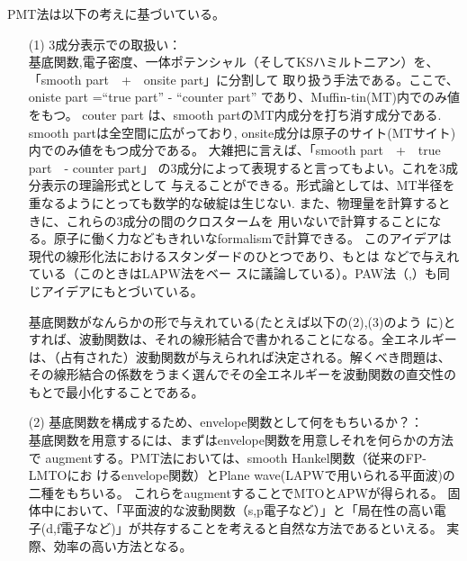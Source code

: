\documentclass[a4paper,10pt,aip,onecolumn,amsmath,amssymb,floatfix,rmp]{revtex4-1}
\begin{document}
PMT法は以下の考えに基づいている。
\begin{itemize}
\item[(1)]
3成分表示での取扱い：\\
基底関数,電子密度、一体ポテンシャル（そしてKSハミルトニアン）を、
「smooth part　+　onsite part」に分割して
取り扱う手法である。ここで、oniste part =``true part'' - ``counter part''
であり、Muffin-tin(MT)内でのみ値をもつ。
couter part は、smooth partのMT内成分を打ち消す成分である.
smooth partは全空間に広がっており,
onsite成分は原子のサイト(MTサイト)内でのみ値をもつ成分である。
大雑把に言えば、「smooth part　+　true part　- counter part」
の3成分によって表現すると言ってもよい。これを3成分表示の理論形式として
与えることができる。形式論としては、MT半径を重なるようにとっても数学的な破綻は生じない.
また、物理量を計算するときに、これらの3成分の間のクロスタームを
用いないで計算することになる。原子に働く力などもきれいなformalismで計算できる。
このアイデアは現代の線形化法におけるスタンダードのひとつであり、もとは
\cite{soler89}などで与えれている（このときはLAPW法をベー
スに議論している）。PAW法（\cite{PAW},\cite{kresse99}）も同じアイデアにもとづいている。

基底関数がなんらかの形で与えれている(たとえば以下の(2),(3)のよう
に)とすれば、波動関数は、それの線形結合で書かれることになる。全エネルギー
は、（占有された）波動関数が与えられれば決定される。解くべき問題は、
その線形結合の係数をうまく選んでその全エネルギーを波動関数の直交性のもとで最小化することである。



\item[(2)]
基底関数を構成するため、envelope関数として何をもちいるか？：\\
基底関数を用意するには、まずはenvelope関数を用意しそれを何らかの方法で
augmentする。PMT法においては、smooth Hankel関数（従来のFP-LMTOにお
けるenvelope関数）とPlane wave(LAPWで用いられる平面波)の二種をもちいる。
これらをaugmentすることでMTOとAPWが得られる。
固体中において、「平面波的な波動関数（s,p電子など）」と「局在性の高い電
子(d,f電子など)」が共存することを考えると自然な方法であるといえる。
実際、効率の高い方法となる。


\end{itemize}
\end{document}
